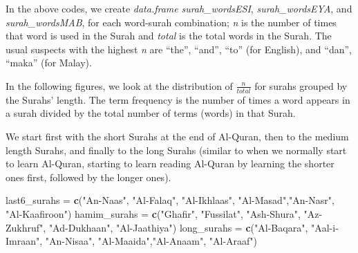 \documentclass[
]{article}
\newenvironment{Shaded}{\begin{snugshade}}{\end{snugshade}}
\newcommand{\FunctionTok}[1]{\textcolor[rgb]{0.13,0.29,0.53}{\textbf{#1}}}
\newcommand{\NormalTok}[1]{#1}
\newcommand{\OtherTok}[1]{\textcolor[rgb]{0.56,0.35,0.01}{#1}}
\newcommand{\StringTok}[1]{\textcolor[rgb]{0.31,0.60,0.02}{#1}}
\begin{document}
In the above codes, we create \emph{data.frame} \emph{surah\_wordsESI}, \emph{surah\_wordsEYA}, and \emph{surah\_wordsMAB}, for each word-surah combination; \emph{n} is the number of times that word is used in the Surah and \emph{total} is the total words in the Surah. The usual suspects with the highest \emph{n} are ``the'', ``and'', ``to'' (for English), and ``dan'', ``maka'' (for Malay).

In the following figures, we look at the distribution of \(\frac{n}{total}\) for surahs grouped by the Surahs' length. The term frequency is the number of times a word appears in a surah divided by the total number of terms (words) in that Surah.

We start first with the short Surahs at the end of Al-Quran, then to the medium length Surahs, and finally to the long Surahs (similar to when we normally start to learn Al-Quran, starting to learn reading Al-Quran by learning the shorter ones first, followed by the longer ones).

\footnotesize

\begin{Shaded}
\begin{Highlighting}[]
\NormalTok{last6\_surahs }\OtherTok{=} \FunctionTok{c}\NormalTok{(}\StringTok{"An{-}Naas"}\NormalTok{, }\StringTok{"Al{-}Falaq"}\NormalTok{, }\StringTok{"Al{-}Ikhlaas"}\NormalTok{, }\StringTok{"Al{-}Masad"}\NormalTok{,}\StringTok{"An{-}Nasr"}\NormalTok{, }\StringTok{"Al{-}Kaafiroon"}\NormalTok{)}
\NormalTok{hamim\_surahs }\OtherTok{=} \FunctionTok{c}\NormalTok{(}\StringTok{"Ghafir"}\NormalTok{, }\StringTok{"Fussilat"}\NormalTok{, }\StringTok{"Ash{-}Shura"}\NormalTok{, }\StringTok{"Az{-}Zukhruf"}\NormalTok{, }\StringTok{"Ad{-}Dukhaan"}\NormalTok{, }\StringTok{"Al{-}Jaathiya"}\NormalTok{)}
\NormalTok{long\_surahs }\OtherTok{=} \FunctionTok{c}\NormalTok{(}\StringTok{"Al{-}Baqara"}\NormalTok{, }\StringTok{"Aal{-}i{-}Imraan"}\NormalTok{, }\StringTok{"An{-}Nisaa"}\NormalTok{, }\StringTok{"Al{-}Maaida"}\NormalTok{,}\StringTok{"Al{-}An\textquotesingle{}aam"}\NormalTok{, }\StringTok{"Al{-}A\textquotesingle{}raaf"}\NormalTok{)}
\end{Highlighting}
\end{Shaded}

\normalsize
\end{document}
